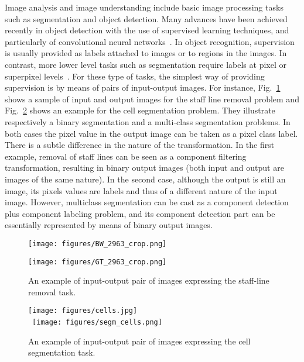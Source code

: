 \documentclass[conference]{IEEEtran}
\begin{document}
Image analysis and image understanding include basic image processing
tasks such as segmentation and object detection. Many advances have
been achieved recently in object detection with the use of supervised
learning techniques, and particularly of convolutional neural
networks~\cite{Krizhevsky:2012,FastRCNN}. In object recognition,
supervision is usually provided as labels attached to images or to
regions in the images. In contrast, more lower level tasks such as
segmentation require labels at pixel or superpixel
levels~\cite{Pinheiro2015FromIT}. For these type of tasks, the
simplest way of providing supervision is by means of pairs of
input-output images.
For instance, Fig.~\ref{fig:training_image1} shows a sample of input
and output images for the staff line removal problem and 
Fig.~\ref{fig:training_image2} shows an example for the cell
segmentation problem. They illustrate respectively a binary
segmentation and a multi-class segmentation problems. In both cases
the pixel value in the output image can be taken as a pixel class label.
There is a subtle difference in the nature of the transformation. In
the first example, removal of staff lines can be seen as a component
filtering transformation, resulting in binary output images (both
input and output are images of the same nature). In the second case,
although the output is still an image, its pixels values are labels
and thus of a different nature of the input image. However, multiclass
segmentation can be cast as a component detection plus component
labeling problem, and its component detection part can be essentially
represented by means of binary output images.

\begin{figure}[htb]
  \centering
  
  \texttt{[image: figures/BW\_2963\_crop.png]}

  \medskip
  \texttt{[image: figures/GT\_2963\_crop.png]}
 
\caption{\label{fig:training_image1}An example of input-output pair of
  images expressing the staff-line removal task.}
\end{figure}

\begin{figure}[htb]
  \centering

  \texttt{[image: figures/cells.jpg]}
  \\\ \texttt{[image: figures/segm\_cells.png]}
\caption{\label{fig:training_image2}An example of input-output pair of
  images expressing the cell segmentation task.}
\end{figure}
\end{document}
